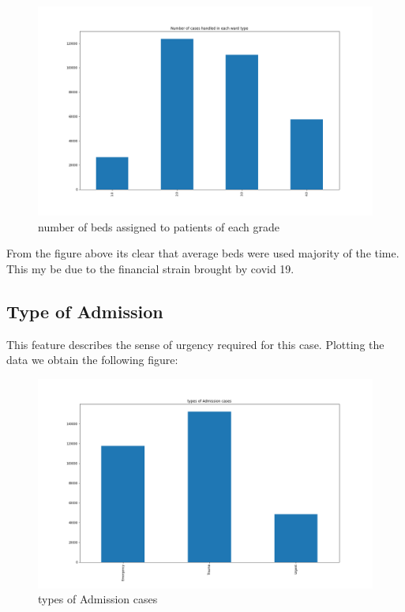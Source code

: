 \documentclass[fleqn]{article}
\begin{document}
			 \begin{figure}[hb]
  				\includegraphics[width=\linewidth]{bed_hist.png}
  				\caption{number of beds assigned to patients of each grade}
  				\label{fig:10}
			\end{figure} 
			\FloatBarrier	
			
			From the figure above its clear that average beds were used majority of the time. This my be due to the financial strain brought by covid 19.
			
		\newpage
		\subsection*{Type of Admission}
			This feature describes the sense of urgency required for this case. Plotting the data we obtain the following figure:
			
			\begin{figure}[hb]
  				\includegraphics[width=\linewidth]{admin_hist.png}
  				\caption{types of Admission cases}
  				\label{fig:11}
			\end{figure} 
			\FloatBarrier
			
\end{document}
